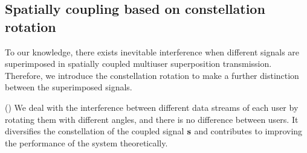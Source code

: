\documentclass[conference]{IEEEtran}
\begin{document}
\subsection{Spatially coupling based on constellation rotation}
To our knowledge, there exists inevitable interference when different signals are superimposed in spatially coupled multiuser superposition transmission. Therefore, we introduce the constellation rotation to make a further distinction between the superimposed signals.

(\uppercase\expandafter{}) We deal with the interference between different data streams of each user by rotating them with different angles, and there is no difference between users. It diversifies the constellation of the coupled signal ${\bf{s}}$ and contributes to improving the performance of the system theoretically.
\end{document}
